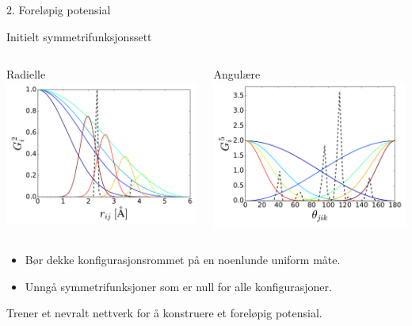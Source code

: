 \documentclass{beamer}
\begin{document}
\begin{frame}{2. Foreløpig potensial}

\begin{block}{Initielt symmetrifunksjonssett}
\begin{columns} %
  \begin{column}{0.5\linewidth} %
   \centering
   Radielle
   \includegraphics[width=\linewidth]{../Figures/Presentation/SiInitialSymmG2.pdf}
  \end{column}
  \begin{column}{0.5\linewidth} %
   \centering
   Angulære
   \includegraphics[width=\linewidth]{../Figures/Presentation/SiInitialSymmG5.pdf}
  \end{column}
\end{columns}
\begin{itemize}
 \item Bør dekke konfigurasjonsrommet på en noenlunde uniform måte. 
 \item Unngå symmetrifunksjoner som er null for alle konfigurasjoner. 
\end{itemize}
\end{block}
\begin{block}{Trener et nevralt nettverk for å konstruere et foreløpig potensial.}
\end{block}


\end{frame}
\end{document}
